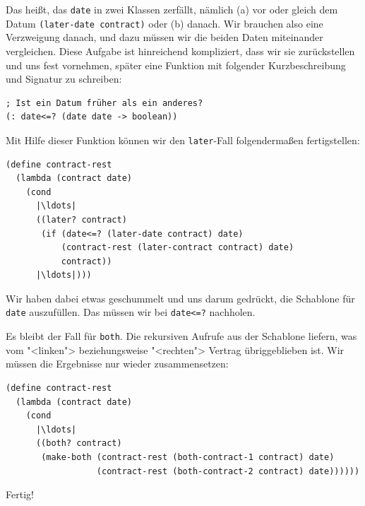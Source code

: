 Das heißt, das \lstinline{date} in zwei Klassen zerfällt, nämlich (a)
vor oder gleich dem Datum \lstinline{(later-date contract)} oder (b)
danach.  Wir brauchen also eine Verzweigung danach, und dazu müssen
wir die beiden Daten miteinander vergleichen.  Diese Aufgabe ist
hinreichend kompliziert, dass wir sie zurückstellen und uns
fest vornehmen, später eine Funktion mit folgender Kurzbeschreibung
und Signatur zu schreiben:
%
\begin{lstlisting}
; Ist ein Datum früher als ein anderes?
(: date<=? (date date -> boolean))
\end{lstlisting}
%
Mit Hilfe dieser Funktion können wir den \lstinline{later}-Fall
folgendermaßen fertigstellen:
%
\begin{lstlisting}
(define contract-rest
  (lambda (contract date)
    (cond
      |\ldots|
      ((later? contract)
       (if (date<=? (later-date contract) date)
           (contract-rest (later-contract contract) date)
           contract))
      |\ldots|)))
\end{lstlisting}
%
Wir haben dabei etwas geschummelt und uns darum gedrückt, die
Schablone für \lstinline{date} auszufüllen.  Das müssen wir bei
\lstinline{date<=?} nachholen.

Es bleibt der Fall für \lstinline{both}.  Die rekursiven Aufrufe aus der
Schablone liefern, was vom "<linken"> beziehungsweise "<rechten">
Vertrag übriggeblieben ist.  Wir müssen die Ergebnisse nur wieder
zusammensetzen:
%
\begin{lstlisting}
(define contract-rest
  (lambda (contract date)
    (cond
      |\ldots|
      ((both? contract)
       (make-both (contract-rest (both-contract-1 contract) date)
                  (contract-rest (both-contract-2 contract) date))))))
\end{lstlisting}
%
Fertig!

